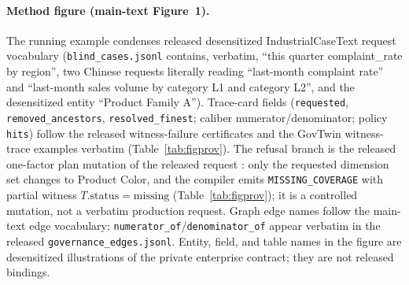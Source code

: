 \documentclass[letterpaper]{article}
\begin{document}
\paragraph{Method figure (main-text Figure~1).}
The running example condenses released desensitized IndustrialCaseText request vocabulary (\texttt{blind\_cases.jsonl} contains, verbatim, ``this quarter complaint\_rate by region'', two Chinese requests literally reading ``last-month complaint rate'' and ``last-month sales volume by category L1 and category L2'', and the desensitized entity ``Product Family A''). Trace-card fields (\texttt{requested}, \texttt{removed\_ancestors}, \texttt{resolved\_finest}; caliber numerator/denominator; policy \texttt{hits}) follow the released witness-failure certificates and the GovTwin witness-trace examples verbatim (Table~\ref{tab:figprov}). The refusal branch is the released one-factor plan mutation  of the released request : only the requested dimension set changes to Product Color, and the compiler emits \texttt{MISSING\_COVERAGE} with partial witness $T.\mathrm{status}{=}\mathrm{missing}$ (Table~\ref{tab:figprov}); it is a controlled mutation, not a verbatim production request. Graph edge names follow the main-text edge vocabulary; \texttt{numerator\_of}/\texttt{denominator\_of} appear verbatim in the released \texttt{governance\_edges.jsonl}. Entity, field, and table names in the figure are desensitized illustrations of the private enterprise contract; they are not released bindings.
\end{document}
